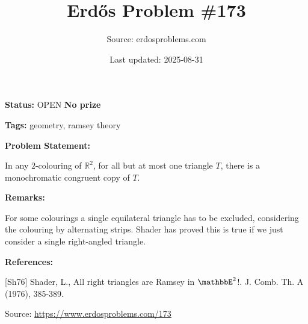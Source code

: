 \documentclass{article}
\title{Erd\H{o}s Problem \#173}
\date{Last updated: 2025-08-31}
\author{Source: erdosproblems.com}
\begin{document}
\maketitle

\noindent\textbf{Status:} OPEN \quad \textbf{No prize}

\noindent\textbf{Tags:} geometry, ramsey theory

\medskip
\noindent\textbf{Problem Statement:}

In any $2$-colouring of $\mathbb{R}^2$, for all but at most one triangle $T$, there is a monochromatic congruent copy of $T$.

\bigskip
\noindent\textbf{Remarks:}

For some colourings a single equilateral triangle has to be excluded, considering the colouring by alternating strips. Shader \cite{Sh76} has proved this is true if we just consider a single right-angled triangle.

\bigskip
\noindent\textbf{References:}

[Sh76] Shader, L., All right triangles are Ramsey in $\mathbbE^2$!. J. Comb. Th. A (1976), 385-389.

\bigskip
\noindent\small{Source: \url{https://www.erdosproblems.com/173}}
\end{document}
